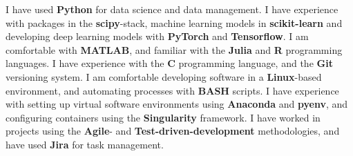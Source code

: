 
\begin{cvRelevantSkills}
I have used \textbf{Python} for data science and data management. I have experience with packages in the \textbf{scipy}-stack, machine learning models in \textbf{scikit-learn} and developing deep learning models with \textbf{PyTorch} and \textbf{Tensorflow}. I am comfortable with \textbf{MATLAB}, and familiar with the \textbf{Julia} and \textbf{R} programming languages.
\newline
\newline
I have experience with the \textbf{C} programming language, and the \textbf{Git} versioning system. I am comfortable developing software in a \textbf{Linux}-based environment, and automating processes with \textbf{BASH} scripts. I have experience with setting up virtual software environments using \textbf{Anaconda} and \textbf{pyenv}, and configuring containers using the \textbf{Singularity} framework. I have worked in projects using the \textbf{Agile}- and \textbf{Test-driven-development} methodologies, and have used \textbf{Jira} for task management. 
\end{cvRelevantSkills}
